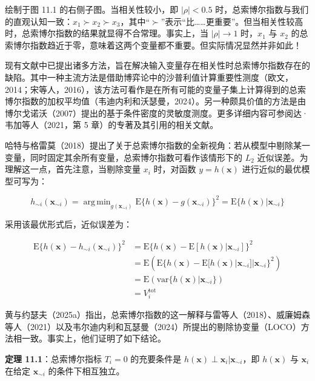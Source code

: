 \documentclass{ctexart}
\DeclareMathOperator*{\argmin}{arg\,min}
\begin{document}
绘制于图 11.1 的右侧子图。当相关性较小，即 $|\rho|<0.5$ 时，总索博尔指数与我们的直观认知一致：$x_1\succ x_2\succ x_3$，其中“$\succ$”表示“比……更重要”。但当相关性较高时，总索博尔指数的结果就显得不合常理。事实上，当 $|\rho|\to1$ 时，$x_1$ 与 $x_2$ 的总索博尔指数趋近于零，意味着这两个变量都不重要。但实际情况显然并非如此！

现有文献中已提出诸多方法，旨在解决输入变量存在相关性时总索博尔指数存在的缺陷。其中一种主流方法是借助博弈论中的沙普利值计算重要性测度（欧文，2014；宋等人，2016），该方法可看作是在所有可能的变量子集上计算得到的总索博尔指数的加权平均值（韦迪内利和沃瑟曼，2024）。另一种颇具价值的方法是由博尔戈诺沃（2007）提出的基于条件密度的灵敏度测度。更多详细内容可参阅达·韦加等人（2021，第 5 章）的专著及其引用的相关文献。

哈特与格雷莫（2018）提出了关于总索博尔指数的全新视角：若从模型中剔除某一变量，同时固定其余所有变量，总索博尔指数可看作该情形下的 $L_2$ 近似误差。为理解这一点，首先注意，当剔除变量 $x_i$ 时，对函数 $y=h(\boldsymbol{x})$ 进行近似的最优模型可写为：

\begin{equation*}
h_{\sim i}(\boldsymbol{x}_{\sim i})=\argmin_{g(\boldsymbol{x}_{\sim i})}\mathrm{E}\{h(\boldsymbol{x})-g(\boldsymbol{x}_{\sim i})\}^2=\mathrm{E}\{h(\boldsymbol{x})|\boldsymbol{x}_{\sim i}\}
\end{equation*}

采用该最优形式后，近似误差为：

\begin{align*}
\mathrm{E}\{h(\boldsymbol{x})-h_{\sim i}(\boldsymbol{x}_{\sim i})\}^2&=\mathrm{E}\{h(\boldsymbol{x})-\mathrm{E}[h(\boldsymbol{x})|\boldsymbol{x}_{\sim i}]\}^2\\
&=\mathrm{E}(\mathrm{E}\{h(\boldsymbol{x})-\mathrm{E}[h(\boldsymbol{x})|\boldsymbol{x}_{\sim i}]|\boldsymbol{x}_{\sim i}\}^2)\\
&=\mathrm{E}(\mathrm{var}\{h(\boldsymbol{x})|\boldsymbol{x}_{\sim i}\})\\
&=V_i^{\mathrm{tot}}
\end{align*}

黄与约瑟夫（2025a）指出，总索博尔指数的这一解释与雷等人（2018）、威廉姆森等人（2021）以及韦尔迪内利和瓦瑟曼（2024）所提出的剔除协变量（LOCO）方法相一致。事实上，他们证明了如下结论。

\begin{mdquote}
\textbf{定理 11.1}：总索博尔指标 $T_i=0$ 的充要条件是 $h(\boldsymbol{x})\perp\boldsymbol{x}_i|\boldsymbol{x}_{\sim i}$，即 $h(\boldsymbol{x})$ 与 $\boldsymbol{x}_i$ 在给定 $\boldsymbol{x}_{\sim i}$ 的条件下相互独立。
\end{mdquote}
\end{document}
